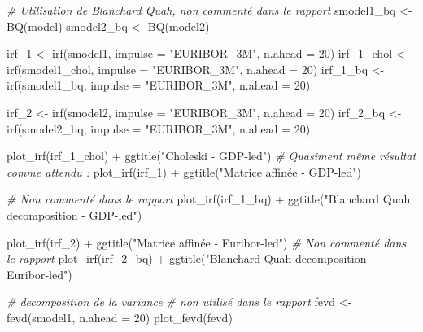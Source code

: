 \documentclass[
  11pt,
]{article}
\newenvironment{Shaded}{\begin{snugshade}}{\end{snugshade}}
\newcommand{\AttributeTok}[1]{\textcolor[rgb]{0.77,0.63,0.00}{#1}}
\newcommand{\CommentTok}[1]{\textcolor[rgb]{0.56,0.35,0.01}{\textit{#1}}}
\newcommand{\DecValTok}[1]{\textcolor[rgb]{0.00,0.00,0.81}{#1}}
\newcommand{\FunctionTok}[1]{\textcolor[rgb]{0.00,0.00,0.00}{#1}}
\newcommand{\NormalTok}[1]{#1}
\newcommand{\OtherTok}[1]{\textcolor[rgb]{0.56,0.35,0.01}{#1}}
\newcommand{\SpecialCharTok}[1]{\textcolor[rgb]{0.00,0.00,0.00}{#1}}
\newcommand{\StringTok}[1]{\textcolor[rgb]{0.31,0.60,0.02}{#1}}
\begin{document}
\begin{Shaded}
\begin{Highlighting}[]
\CommentTok{\# Utilisation de Blanchard Quah, non commenté dans le rapport}
\NormalTok{smodel1\_bq }\OtherTok{\textless{}{-}} \FunctionTok{BQ}\NormalTok{(model)}
\NormalTok{smodel2\_bq }\OtherTok{\textless{}{-}} \FunctionTok{BQ}\NormalTok{(model2)}

\NormalTok{irf\_1 }\OtherTok{\textless{}{-}} \FunctionTok{irf}\NormalTok{(smodel1, }\AttributeTok{impulse =} \StringTok{"EURIBOR\_3M"}\NormalTok{,}
           \AttributeTok{n.ahead =} \DecValTok{20}\NormalTok{)}
\NormalTok{irf\_1\_chol }\OtherTok{\textless{}{-}} \FunctionTok{irf}\NormalTok{(smodel1\_chol, }\AttributeTok{impulse =} \StringTok{"EURIBOR\_3M"}\NormalTok{,}
             \AttributeTok{n.ahead =} \DecValTok{20}\NormalTok{)}
\NormalTok{irf\_1\_bq }\OtherTok{\textless{}{-}} \FunctionTok{irf}\NormalTok{(smodel1\_bq, }\AttributeTok{impulse =} \StringTok{"EURIBOR\_3M"}\NormalTok{,}
                  \AttributeTok{n.ahead =} \DecValTok{20}\NormalTok{)}

\NormalTok{irf\_2 }\OtherTok{\textless{}{-}} \FunctionTok{irf}\NormalTok{(smodel2, }\AttributeTok{impulse =} \StringTok{"EURIBOR\_3M"}\NormalTok{,}
             \AttributeTok{n.ahead =} \DecValTok{20}\NormalTok{)}
\NormalTok{irf\_2\_bq }\OtherTok{\textless{}{-}} \FunctionTok{irf}\NormalTok{(smodel2\_bq, }\AttributeTok{impulse =} \StringTok{"EURIBOR\_3M"}\NormalTok{,}
                \AttributeTok{n.ahead =} \DecValTok{20}\NormalTok{)}

\FunctionTok{plot\_irf}\NormalTok{(irf\_1\_chol) }\SpecialCharTok{+} \FunctionTok{ggtitle}\NormalTok{(}\StringTok{"Choleski {-} GDP{-}led"}\NormalTok{) }
\CommentTok{\# Quasiment même résultat comme attendu :}
\FunctionTok{plot\_irf}\NormalTok{(irf\_1) }\SpecialCharTok{+} \FunctionTok{ggtitle}\NormalTok{(}\StringTok{"Matrice affinée {-} GDP{-}led"}\NormalTok{)}

\CommentTok{\# Non commenté dans le rapport}
\FunctionTok{plot\_irf}\NormalTok{(irf\_1\_bq) }\SpecialCharTok{+} \FunctionTok{ggtitle}\NormalTok{(}\StringTok{"Blanchard Quah decomposition {-} GDP{-}led"}\NormalTok{) }

\FunctionTok{plot\_irf}\NormalTok{(irf\_2) }\SpecialCharTok{+} \FunctionTok{ggtitle}\NormalTok{(}\StringTok{"Matrice affinée {-} Euribor{-}led"}\NormalTok{)}
\CommentTok{\# Non commenté dans le rapport}
\FunctionTok{plot\_irf}\NormalTok{(irf\_2\_bq) }\SpecialCharTok{+} \FunctionTok{ggtitle}\NormalTok{(}\StringTok{"Blanchard Quah decomposition {-} Euribor{-}led"}\NormalTok{)}

\CommentTok{\# decomposition de la variance}
\CommentTok{\# non utilisé dans le rapport}
\NormalTok{fevd }\OtherTok{\textless{}{-}} \FunctionTok{fevd}\NormalTok{(smodel1, }\AttributeTok{n.ahead =} \DecValTok{20}\NormalTok{)}
\FunctionTok{plot\_fevd}\NormalTok{(fevd)}



\end{Highlighting}
\end{Shaded}
\end{document}
